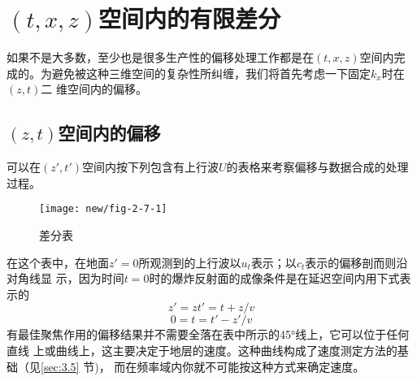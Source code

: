 \section{$(t, x, z)$空间内的有限差分}
\label{sec:2.7}

如果不是大多数，至少也是很多生产性的偏移处理工作都是在$(t,x,z)$空间内完
成的。为避免被这种三维空间的复杂性所纠缠，我们将首先考虑一下固定$k_x$时在$(z,t)$二
维空间内的偏移。

\subsection{$(z,t)$空间内的偏移}
\label{sec:2.7.1}

可以在$(z',t')$空间内按下列包含有上行波$U$的表格来考察偏移与数据合成的处理过程。
\begin{figure}[H]
\centering
\texttt{[image: new/fig-2-7-1]}
\caption{差分表}
\label{fig:new/fig-2-7-1}
\end{figure}
在这个表中，在地面$z'=0$所观测到的上行波以$u_t$表示；以$c_t$表示的偏移剖而则沿对角线显
示，因为时间$t=0$时的爆炸反射面的成像条件是在延迟空间内用下式表示的
\begin{subequations}
\begin{equation}
z'=z
\label{eq:ex2.7.2a}
\end{equation}
\begin{equation}
t'=t+z/v
\label{eq:ex2.7.2b}
\end{equation}
\label{eq:ex2.7.2}
\end{subequations}
\begin{equation}
0=t=t'-z'/v
\label{eq:ex2.7.3}
\end{equation}
有最佳聚焦作用的偏移结果并不需要全落在表中所示的45°线上，它可以位于任何直线
上或曲线上，这主要决定于地层的速度。这种曲线构成了速度测定方法的基础（见\ref{sec:3.5}
节)， 而在频率域内你就不可能按这种方式来确定速度。

